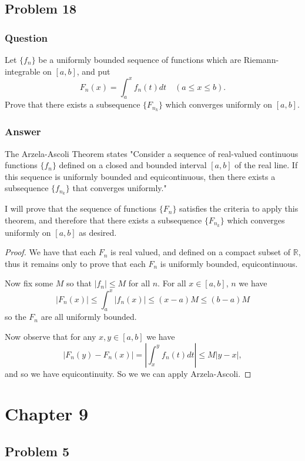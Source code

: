 \documentclass[12pt]{article}
\begin{document}
\subsection{Problem 18}

\subsubsection{Question}
Let $\{f_n\}$ be a uniformly bounded sequence of functions which are Riemann-integrable on $[a,b]$, and put
\[F_n (x) = \int_a^x f_n(t)dt \quad (a \leq x \leq b).\]
Prove that there exists a subsequence $\{ F_{n_k}\}$ which converges uniformly on $[a,b]$.
\subsubsection{Answer}
The Arzela-Ascoli Theorem states "Consider a sequence of real-valued continuous functions $\{f_n\}$ defined on a closed and bounded interval $[a, b]$ of the real line. If this sequence is uniformly bounded and equicontinuous, then there exists a subsequence $\{f_{n_k}\}$ that converges uniformly."

I will prove that the sequence of functions $\{F_n\}$ satisfies the criteria to apply this theorem, and therefore that there exists a subsequence  $\{ F_{n_k}\}$ which converges uniformly on $[a,b]$ as desired. 

\begin{proof}
We have that each $F_n$ is real valued, and defined on a compact subset of $\mathbb{R}$, thus it remains only to prove that each $F_n$ is uniformly bounded, equicontinuous. 


Now fix some $M$ so that $|f_n| \leq M$ for all $n$. For all $x \in [a,b]$, $n$ we have 
\[|F_n(x)| \leq \int_a^x |f_n(x)| \leq (x-a)M \leq (b-a)M\] 
so the $F_n$ are all uniformly bounded.

Now observe that for any $x, y  \in [a,b]$ we have
\[|F_n(y)-F_n(x)| = \left|\int_x^y f_n(t)dt \right| \leq M|y-x|,\]
and so we have equicontinuity. So we we can apply Arzela-Ascoli.
\end{proof}


\section{Chapter 9}
\subsection{Problem 5}
\end{document}
